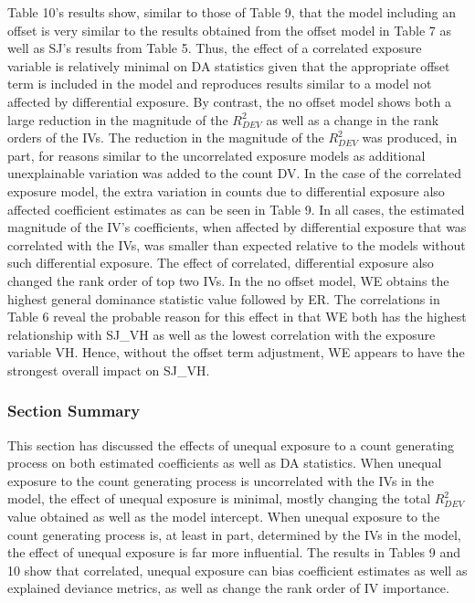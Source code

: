 \documentclass[ShortAfour,times,sageapa]{sagej}
\begin{document}
	Table 10's results show, similar to those of Table 9, that the model including an offset is very similar to the results obtained from the offset model in Table 7 as well as SJ's results from Table 5.
	Thus, the effect of a correlated exposure variable is relatively minimal on DA statistics given that the appropriate offset term is included in the model and reproduces results similar to a model not affected by differential exposure.
	By contrast, the no offset model shows both a large reduction in the magnitude of the $R^2_{DEV}$ as well as a change in the rank orders of the IVs.
	The reduction in the magnitude of the $R^2_{DEV}$ was produced, in part, for reasons similar to the uncorrelated exposure models as additional unexplainable variation was added to the count DV. 
	In the case of the correlated exposure model, the extra variation in counts due to differential exposure also affected coefficient estimates as can be seen in Table 9.
	In all cases, the estimated magnitude of the IV's coefficients, when affected by differential exposure that was correlated with the IVs, was smaller than expected relative to the models without such differential exposure.
	The effect of correlated, differential exposure also changed the rank order of top two IVs.
	In the no offset model, WE obtains the highest general dominance statistic value followed by ER.
	The correlations in Table 6 reveal the probable reason for this effect in that WE both has the highest relationship with SJ\_VH as well as the lowest correlation with the exposure variable VH.
	Hence, without the offset term adjustment, WE appears to have the strongest overall impact on SJ\_VH.
	
		\subsubsection{Section Summary}
		
	This section has discussed the effects of unequal exposure to a count generating process on both estimated coefficients as well as DA statistics.
	When unequal exposure to the count generating process is uncorrelated with the IVs in the model, the effect of unequal exposure is minimal, mostly changing the total $R^2_{DEV}$ value obtained as well as the model intercept.
	When unequal exposure to the count generating process is, at least in part, determined by the IVs in the model, the effect of unequal exposure is far more influential.
	The results in Tables 9 and 10 show that correlated, unequal exposure can bias coefficient estimates as well as explained deviance metrics, as well as change the rank order of IV importance.
	
\end{document}
